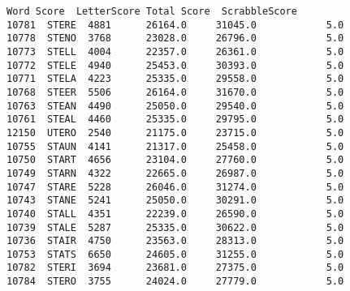 \documentclass[11pt]{article}
\makeatletter
\newcommand{\boxspacing}{\kern\kvtcb@left@rule\kern\kvtcb@boxsep}
\newcommand{\prompt}[4]{
        {\ttfamily\llap{{\color{#2}[#3]:\hspace{3pt}#4}}\vspace{-\baselineskip}}
    }
\makeatother
\begin{document}
            \begin{tcolorbox}[breakable, size=fbox, boxrule=.5pt, pad at break*=1mm, opacityfill=0]
\prompt{Out}{outcolor}{14}{\boxspacing}
\begin{Verbatim}[commandchars=\\\{\}]
        Word Score  LetterScore Total Score  ScrabbleScore
10781  STERE  4881      26164.0     31045.0            5.0
10778  STENO  3768      23028.0     26796.0            5.0
10773  STELL  4004      22357.0     26361.0            5.0
10772  STELE  4940      25453.0     30393.0            5.0
10771  STELA  4223      25335.0     29558.0            5.0
10768  STEER  5506      26164.0     31670.0            5.0
10763  STEAN  4490      25050.0     29540.0            5.0
10761  STEAL  4460      25335.0     29795.0            5.0
12150  UTERO  2540      21175.0     23715.0            5.0
10755  STAUN  4141      21317.0     25458.0            5.0
10750  START  4656      23104.0     27760.0            5.0
10749  STARN  4322      22665.0     26987.0            5.0
10747  STARE  5228      26046.0     31274.0            5.0
10743  STANE  5241      25050.0     30291.0            5.0
10740  STALL  4351      22239.0     26590.0            5.0
10739  STALE  5287      25335.0     30622.0            5.0
10736  STAIR  4750      23563.0     28313.0            5.0
10753  STATS  6650      24605.0     31255.0            5.0
10782  STERI  3694      23681.0     27375.0            5.0
10784  STERO  3755      24024.0     27779.0            5.0
\end{Verbatim}
\end{tcolorbox}
        

    
    
    
\end{document}
